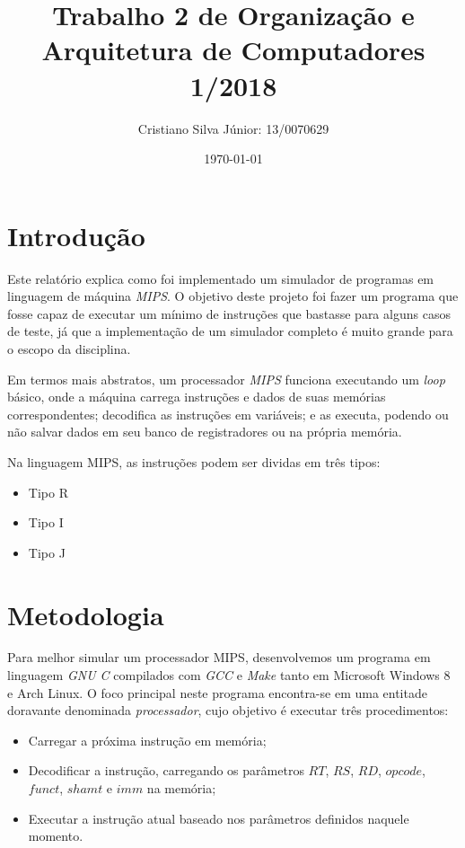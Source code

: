 \documentclass[12pt, a4paper, twoside]{article}
\begin{document}
\title{Trabalho 2 de Organização e Arquitetura de Computadores 1/2018}
\author{Cristiano Silva Júnior: 13/0070629}
\date{\today}
\maketitle

\section{Introdução}

Este relatório explica como foi implementado um simulador de programas em
linguagem de máquina \textit{MIPS}. O objetivo deste projeto foi fazer um
programa que fosse capaz de executar um mínimo de instruções que bastasse
para alguns casos de teste, já que a implementação de um simulador completo é
muito grande para o escopo da disciplina.

Em termos mais abstratos, um processador \textit{MIPS} funciona executando um
\textit{loop} básico, onde a máquina carrega instruções e dados de suas
memórias correspondentes; decodifica as instruções em variáveis; e as executa,
podendo ou não salvar dados em seu banco de registradores ou na própria
memória.

Na linguagem MIPS, as instruções podem ser dividas em três tipos:

\begin{itemize}
    \item Tipo R
    \item Tipo I
    \item Tipo J
\end{itemize}

\section{Metodologia}

Para melhor simular um processador MIPS, desenvolvemos um programa em linguagem
\textit{GNU C} compilados com \textit{GCC} e \textit{Make} tanto em Microsoft
Windows 8 e Arch Linux. O foco principal neste programa encontra-se em uma
entitade doravante denominada \textit{processador}, cujo objetivo é executar
três procedimentos:

\begin{itemize}
    \item Carregar a próxima instrução em memória;
    \item Decodificar a instrução, carregando os parâmetros $RT$, $RS$, $RD$,
    $opcode$, $funct$, $shamt$ e $imm$ na memória;
    \item Executar a instrução atual baseado nos parâmetros definidos naquele
    momento.
\end{itemize}
\end{document}
